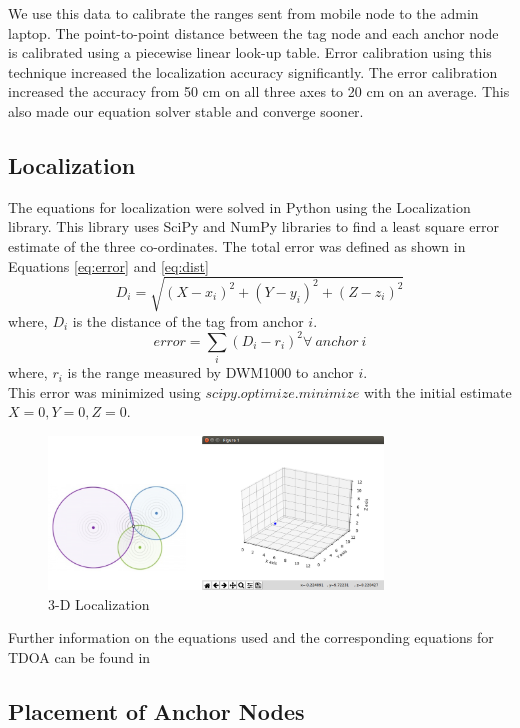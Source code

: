\documentclass[journal,transmag]{IEEEtran}
\begin{document}
We use this data to calibrate the ranges sent from mobile node to the admin laptop. The point-to-point distance between the tag node and each anchor node is calibrated using a piecewise linear look-up table. Error calibration using this technique increased the localization accuracy significantly. The error calibration increased the accuracy from 50 cm on all three axes to 20 cm on an average. This also made our equation solver stable and converge sooner.
\subsection{Localization}
The equations for localization were solved in Python using the Localization library\cite{kamalshadi:2017}. This library uses SciPy and NumPy libraries to find a least square error estimate of the three co-ordinates. The total error was defined as shown in Equations \ref{eq:error} and \ref{eq:dist}
\begin{equation}
\label{eq:dist}
D_i = \sqrt{(X-x_i)^2 + (Y-y_i)^2 + (Z-z_i)^2}
\end{equation}
where, $D_i$ is the distance of the tag from anchor $i$.\\
\begin{equation}
\label{eq:error}
 error = \sum\limits_{i} (D_i - r_i)^2 \forall\ anchor\ i
\end{equation}
where, $r_i$ is the range measured by DWM1000 to anchor $i$.\\

This error was minimized using $scipy.optimize.minimize$ with the initial estimate $X=0,Y=0,Z=0$.

\begin{figure}[!h]
\centering
\includegraphics[width=3.5in]{3D_localization.png}
\caption{{3-D Localization}}
\label{3dlocalization}
\end{figure}

Further information on the equations used and the corresponding equations for TDOA can be found in \cite{gaffney2008considerations}



\subsection{Placement of Anchor Nodes}
\end{document}
